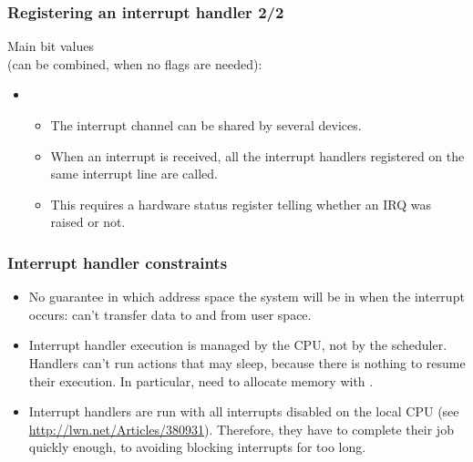 \begin{frame}
  \frametitle{Registering an interrupt handler 2/2}
  Main  bit values\\
  (can be combined,  when no flags are needed):
  \begin{itemize}
     \item {}
     \begin{itemize}
        \item The interrupt channel can be shared by several
        devices.
	\item When an interrupt is received, all the interrupt
	handlers registered on the same interrupt line are called.
	\item This requires a hardware status register telling whether
        an IRQ was raised or not.
     \end{itemize}
  \end{itemize}
\end{frame}

\begin{frame}
  \frametitle{Interrupt handler constraints}
  \begin{itemize}
  \item No guarantee in which address space the system will be in when
    the interrupt occurs: can't transfer data to and from user space.
  \item Interrupt handler execution is managed by the CPU, not by the
    scheduler.  Handlers can't run actions that may sleep, because
    there is nothing to resume their execution. In particular, need to
    allocate memory with .
  \item Interrupt handlers are run with all interrupts disabled on
    the local CPU (see \url{http://lwn.net/Articles/380931}).
    Therefore, they have to complete their job quickly
    enough, to avoiding blocking interrupts for too long.
  \end{itemize}
\end{frame}

